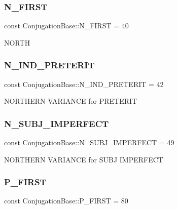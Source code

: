 \subsubsection{\texorpdfstring{N\+\_\+\+F\+I\+R\+ST}{N\_FIRST}}
{\footnotesize\ttfamily const Conjugation\+Base\+::\+N\+\_\+\+F\+I\+R\+ST = 40}

N\+O\+R\+TH \hypertarget{class_conjugation_base_ace5ce9108e8d34a8111cd51dbe9c3598}{}\label{class_conjugation_base_ace5ce9108e8d34a8111cd51dbe9c3598} 
\subsubsection{\texorpdfstring{N\+\_\+\+I\+N\+D\+\_\+\+P\+R\+E\+T\+E\+R\+IT}{N\_IND\_PRETERIT}}
{\footnotesize\ttfamily const Conjugation\+Base\+::\+N\+\_\+\+I\+N\+D\+\_\+\+P\+R\+E\+T\+E\+R\+IT = 42}

N\+O\+R\+T\+H\+E\+RN V\+A\+R\+I\+A\+N\+CE for P\+R\+E\+T\+E\+R\+IT \hypertarget{class_conjugation_base_a4b0123c72fd74dfbfd3fa42d71bd7e39}{}\label{class_conjugation_base_a4b0123c72fd74dfbfd3fa42d71bd7e39} 
\subsubsection{\texorpdfstring{N\+\_\+\+S\+U\+B\+J\+\_\+\+I\+M\+P\+E\+R\+F\+E\+CT}{N\_SUBJ\_IMPERFECT}}
{\footnotesize\ttfamily const Conjugation\+Base\+::\+N\+\_\+\+S\+U\+B\+J\+\_\+\+I\+M\+P\+E\+R\+F\+E\+CT = 49}

N\+O\+R\+T\+H\+E\+RN V\+A\+R\+I\+A\+N\+CE for S\+U\+BJ I\+M\+P\+E\+R\+F\+E\+CT \hypertarget{class_conjugation_base_ac632d52e6076cf1bb490c82291d4c76f}{}\label{class_conjugation_base_ac632d52e6076cf1bb490c82291d4c76f} 
\subsubsection{\texorpdfstring{P\+\_\+\+F\+I\+R\+ST}{P\_FIRST}}
{\footnotesize\ttfamily const Conjugation\+Base\+::\+P\+\_\+\+F\+I\+R\+ST = 80}

